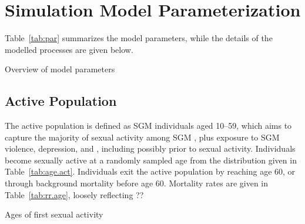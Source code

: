 \section{Simulation Model Parameterization}\label{mod.par}
Table~\ref{tab:par} summarizes the model parameters,
while the details of the modelled processes are given below.
\begin{table}
  \baselineskip
  \caption{Overview of model parameters}
  \label{tab:par}
  \centering
\end{table}
\subsection{Active Population}\label{mod.par.act}
The active population is defined as SGM individuals aged 10--59,
which aims to capture the majority of sexual activity among SGM \cite{??},
plus exposure to SGM violence, depression, and \hazdrink,
including possibly prior to sexual activity.
Individuals become sexually active at a randomly sampled age from the distribution
given in Table~\ref{tab:age.act}.
Individuals exit the active population by reaching age 60,
or through background mortality before age 60.
Mortality rates are given in Table~\ref{tab:rr.age},
loosely reflecting ??
\begin{table}
  \caption{Ages of first sexual activity}
  \label{tab:age.act}
  \centering
\end{table}
